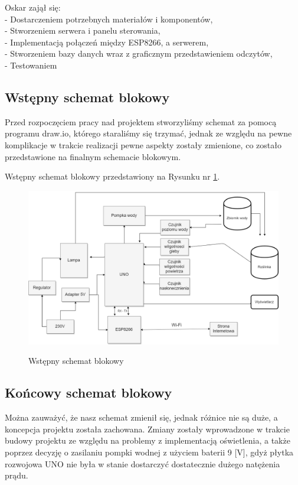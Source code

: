 \documentclass[12pt]{article}
\begin{document}
Oskar zajął się:\\
- Dostarczeniem potrzebnych materiałów i komponentów,\\
- Stworzeniem serwera i panelu sterowania,\\
- Implementacją połączeń między ESP8266, a serwerem,\\
- Stworzeniem bazy danych wraz z graficznym przedstawieniem odczytów,\\
- Testowaniem

\subsection{Wstępny schemat blokowy}
Przed rozpoczęciem pracy nad projektem stworzyliśmy schemat za pomocą programu draw.io, którego staraliśmy się trzymać, jednak ze względu na pewne komplikacje w trakcie realizacji pewne aspekty zostały zmienione, co zostało przedstawione na finalnym schemacie blokowym.

Wstępny schemat blokowy przedstawiony na Rysunku nr \ref{fig:wstepnyschemat}.
\begin{figure}[!h]
	\begin{center}
		{\includegraphics[width=14cm]{schemat_blokowy.png}}
	\end{center}
	\caption{Wstępny schemat blokowy}
	\label{fig:wstepnyschemat}
\end{figure}

\newpage
\subsection{Końcowy schemat blokowy}
Można zauważyć, że nasz schemat zmienił się, jednak różnice nie są duże, a koncepcja projektu została zachowana. Zmiany zostały wprowadzone w trakcie budowy projektu ze względu na problemy z implementacją oświetlenia, a także poprzez decyzję o zasilaniu pompki wodnej z użyciem baterii 9 [V], gdyż płytka rozwojowa UNO nie była w stanie dostarczyć dostatecznie dużego natężenia prądu.
\end{document}
